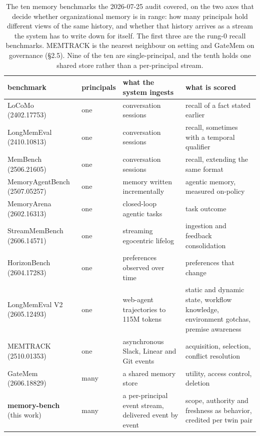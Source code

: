 \documentclass[11pt]{article}
\begin{document}
\begin{table}[tb]
\centering\footnotesize
\setlength{\tabcolsep}{4pt}
\begin{tabular}{@{}>{\raggedright\arraybackslash}p{39mm} l >{\raggedright\arraybackslash}p{31mm} >{\raggedright\arraybackslash}p{50mm}@{}}
\toprule
benchmark & principals & what the system ingests & what is scored \\
\midrule
LoCoMo \scriptsize(2402.17753) & one & conversation sessions & recall of a fact stated earlier \\
LongMemEval \scriptsize(2410.10813) & one & conversation sessions & recall, sometimes with a temporal qualifier \\
MemBench \scriptsize(2506.21605) & one & conversation sessions & recall, extending the same format \\
MemoryAgentBench \scriptsize(2507.05257) & one & memory written incrementally & agentic memory, measured on-policy \\
MemoryArena \scriptsize(2602.16313) & one & closed-loop agentic tasks & task outcome \\
StreamMemBench \scriptsize(2606.14571) & one & streaming egocentric lifelog & ingestion and feedback consolidation \\
HorizonBench \scriptsize(2604.17283) & one & preferences observed over time & preferences that change \\
LongMemEval V2 \scriptsize(2605.12493) & one & web-agent trajectories to 115M tokens & static and dynamic state, workflow knowledge, environment gotchas, premise awareness \\
MEMTRACK \scriptsize(2510.01353) & one & asynchronous Slack, Linear and Git events & acquisition, selection, conflict resolution \\
GateMem \scriptsize(2606.18829) & many & a shared memory store & utility, access control, deletion \\
\midrule
\textbf{memory-bench} \scriptsize(this work) & many & a per-principal event stream, delivered event by event & scope, authority and freshness as behavior, credited per twin pair \\
\bottomrule
\end{tabular}
\caption{The ten memory benchmarks the 2026-07-25 audit covered, on the two axes that decide whether organizational memory is in range: how many principals hold different views of the same history, and whether that history arrives as a stream the system has to write down for itself. The first three are the rung-0 recall benchmarks. MEMTRACK is the nearest neighbour on setting and GateMem on governance (\S2.5). Nine of the ten are single-principal, and the tenth holds one shared store rather than a per-principal stream.}
\label{tab:landscape}
\end{table}
\end{document}
